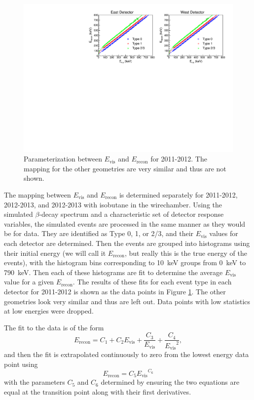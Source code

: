 \begin{figure}[h]
  \centering
  \includegraphics[scale=0.78]{3-UCNAAnalysis/2011-2012_Evis_to_Erecon.pdf}
  \caption{Parameterization between $E_{\mathrm{vis}}$ and $E_{\mathrm{recon}}$ for
    2011-2012. The mapping for the other geometries are very similar and thus are
    not shown.}
  \label{fig:Erecon}
\end{figure}

The mapping between $E_{\mathrm{vis}}$ and $E_{\mathrm{recon}}$ is determined separately
for 2011-2012, 2012-2013, and 2012-2013 with isobutane in the wirechamber.
Using the simulated $\beta$-decay spectrum and a characteristic set of detector
response variables, the simulated events are processed in the same manner as
they would be for data. They are identified as Type 0, 1, or 2/3, and their
$E_{\mathrm{vis}}$ values for each detector are determined. Then the events are
grouped into histograms using their initial energy (we will call it $E_{\mathrm{recon}}$,
but really this is the true energy of the events), with the histogram bins corresponding
to 10~keV groups from 0~keV to 790~keV. Then each of these histograms are fit to
determine the average $E_{\mathrm{vis}}$ value for a given $E_{\mathrm{recon}}$. The results
of these fits for each event type in each detector for 2011-2012 is shown as the data
points in Figure \ref{fig:Erecon}. The other geometries look very similar and thus are
left out. Data points with low statistics at low energies were dropped.

The fit to the data is of the form
\begin{equation}
  E_{\mathrm{recon}} = C_1 + C_2E_{\mathrm{vis}} + \frac{C_3}{E_{\mathrm{vis}}} + \frac{C_4}{{E_{\mathrm{vis}}}^2},
\end{equation}
and then the fit is extrapolated continuously to zero from the lowest energy data point using
\begin{equation}
  E_{\mathrm{recon}} = C_5{E_{\mathrm{vis}}}^{C_6}
\end{equation}
with the parameters $C_5$ and $C_6$ determined by ensuring the two equations are equal at the
transition point along with their first derivatives.

